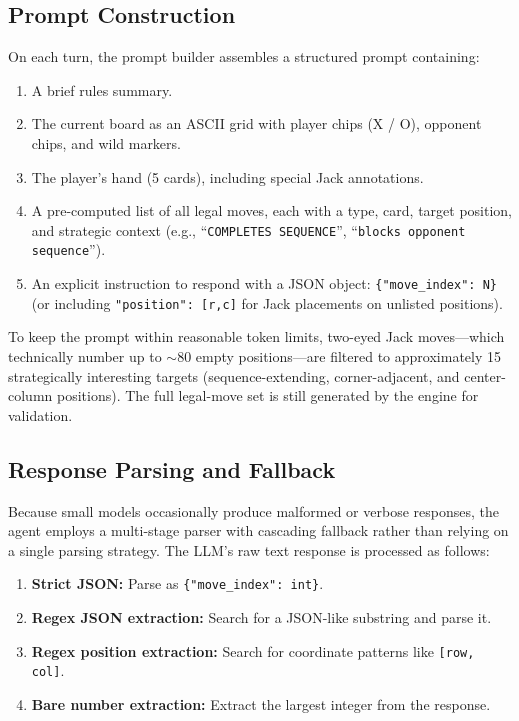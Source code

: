 \documentclass[11pt]{article}
\begin{document}
\subsection{Prompt Construction}

On each turn, the prompt builder assembles a structured prompt containing:
\begin{enumerate}[nosep,label=(\roman*)]
\item A brief rules summary.
\item The current board as an ASCII grid with player chips (X / O), opponent chips, and wild markers.
\item The player's hand (5 cards), including special Jack annotations.
\item A pre-computed list of all legal moves, each with a type, card, target position, and strategic context (e.g., ``\texttt{COMPLETES SEQUENCE}'', ``\texttt{blocks opponent sequence}'').
\item An explicit instruction to respond with a JSON object: \texttt{\{"move\_index": N\}} (or including \texttt{"position": [r,c]} for Jack placements on unlisted positions).
\end{enumerate}

To keep the prompt within reasonable token limits, two-eyed Jack moves---which technically number up to $\sim$80 empty positions---are filtered to approximately 15 strategically interesting targets (sequence-extending, corner-adjacent, and center-column positions). The full legal-move set is still generated by the engine for validation.

\subsection{Response Parsing and Fallback}

Because small models occasionally produce malformed or verbose responses, the agent employs a multi-stage parser with cascading fallback rather than relying on a single parsing strategy. The LLM's raw text response is processed as follows:
\begin{enumerate}[nosep,label=(\roman*)]
\item \textbf{Strict JSON:} Parse as \texttt{\{"move\_index": int\}}.
\item \textbf{Regex JSON extraction:} Search for a JSON-like substring and parse it.
\item \textbf{Regex position extraction:} Search for coordinate patterns like \texttt{[row, col]}.
\item \textbf{Bare number extraction:} Extract the largest integer from the response.
\end{enumerate}
\end{document}
